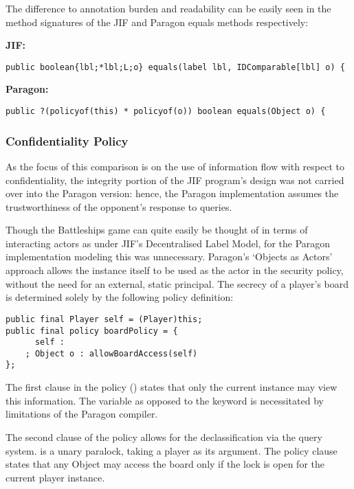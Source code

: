 The difference to annotation burden and readability can be easily seen in the method signatures of the JIF and Paragon equals methods respectively:

\textbf{JIF:}

\begin{verbatim}
public boolean{lbl;*lbl;L;o} equals(label lbl, IDComparable[lbl] o) {
\end{verbatim}

\textbf{Paragon:}

\begin{verbatim}
public ?(policyof(this) * policyof(o)) boolean equals(Object o) {
\end{verbatim}

\subsubsection{Confidentiality Policy}

As the focus of this comparison is on the use of information flow with respect to confidentiality, the integrity portion of the JIF program's design was not carried over into the Paragon version: hence, the Paragon implementation assumes the trustworthiness of the opponent's response to queries.

Though the Battleships game can quite easily be thought of in terms of interacting actors as under JIF's Decentralised Label Model, for the Paragon implementation modeling this was unnecessary. Paragon's `Objects as Actors' approach allows the  instance itself to be used as the actor in the security policy, without the need for an external, static principal. The secrecy of a player's board is determined solely by the following policy definition:

\begin{verbatim}
public final Player self = (Player)this;
public final policy boardPolicy = {
	  self :
	; Object o : allowBoardAccess(self)
};
\end{verbatim}

The first clause in the policy () states that only the current instance may view this information. The  variable as opposed to the  keyword is necessitated by limitations of the Paragon compiler.

The second clause of the policy allows for the declassification via the query system.  is a unary paralock, taking a player as its argument. The policy clause states that any Object  may access the board only if the  lock is open for the current player instance.

